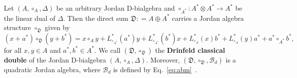 \documentclass[12pt, reqno, a4paper]{amsart}
\theoremstyle{definition}
\begin{document}
Let $(A, \circ_A, \Delta)$ be an arbitrary Jordan D-bialgebra and $\circ_{A^*}: A^* \otimes A^* \to A^*$ be the linear dual of $\Delta$. 
Then the direct sum $\mathfrak{D}: = A \oplus A^*$ carries a Jordan algebra structure $\circ_{\mathfrak{D}}$ given by
\begin{equation*}
	(x+a^*) \circ_{\mathfrak{D}} (y+b^*) = x \circ_A y + L_{\circ_{A^*}}^{*}(a^*) y +L_{\circ_{A^*}}^{*}(b^*) x+L_{\circ_A}^{*}(x) b^*+L_{\circ_A}^{*}(y) a^* + a^* \circ_{A^*} b^*,
\end{equation*}
for all $x,y \in A$ and $a^*, b^* \in A^*$. 
We call $(\mathfrak{D}, \circ_{\mathfrak{D}})$ the \textbf{Drinfeld classical double} of the Jordan D-bialgebra $(A, \circ_A, \Delta)$. 
Moreover, $(\mathfrak{D}, \circ_{\mathfrak{D}}, \mathcal{B}_{d})$ is a quadratic Jordan algebra, where $\mathcal{B}_{d}$ is defined by Eq.~\eqref{eq:abm}~\cite{hou2022new}.
\end{document}
